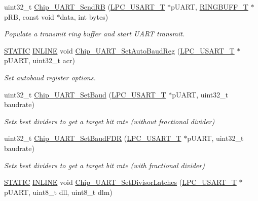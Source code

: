 \begin{DoxyCompactItemize}
uint32\+\_\+t \hyperlink{group__UART__17XX__40XX_ga6ed43ed19b9d2a32ece3e50bc2f651a9}{Chip\+\_\+\+U\+A\+R\+T\+\_\+\+Send\+RB} (\hyperlink{structLPC__USART__T}{L\+P\+C\+\_\+\+U\+S\+A\+R\+T\+\_\+T} $\ast$p\+U\+A\+RT, \hyperlink{structRINGBUFF__T}{R\+I\+N\+G\+B\+U\+F\+F\+\_\+T} $\ast$p\+RB, const void $\ast$data, int bytes)
\begin{DoxyCompactList}\small\item\em Populate a transmit ring buffer and start U\+A\+RT transmit. \end{DoxyCompactList}\item 
\hyperlink{group__LPC__Types__Public__Macros_ga10b2d890d871e1489bb02b7e70d9bdfb}{S\+T\+A\+T\+IC} \hyperlink{group__LPC__Types__Public__Types_ga2eb6f9e0395b47b8d5e3eeae4fe0c116}{I\+N\+L\+I\+NE} void \hyperlink{group__UART__17XX__40XX_ga4ae4f3c36bdae1bf8a93c0420ee74b40}{Chip\+\_\+\+U\+A\+R\+T\+\_\+\+Set\+Auto\+Baud\+Reg} (\hyperlink{structLPC__USART__T}{L\+P\+C\+\_\+\+U\+S\+A\+R\+T\+\_\+T} $\ast$p\+U\+A\+RT, uint32\+\_\+t acr)
\begin{DoxyCompactList}\small\item\em Set autobaud register options. \end{DoxyCompactList}\item 
uint32\+\_\+t \hyperlink{group__UART__17XX__40XX_ga19f24dcf53316cbfb204003f506d5be5}{Chip\+\_\+\+U\+A\+R\+T\+\_\+\+Set\+Baud} (\hyperlink{structLPC__USART__T}{L\+P\+C\+\_\+\+U\+S\+A\+R\+T\+\_\+T} $\ast$p\+U\+A\+RT, uint32\+\_\+t baudrate)
\begin{DoxyCompactList}\small\item\em Sets best dividers to get a target bit rate (without fractional divider) \end{DoxyCompactList}\item 
uint32\+\_\+t \hyperlink{group__UART__17XX__40XX_gad22ce7fc8360c02aab39b2dd586088fd}{Chip\+\_\+\+U\+A\+R\+T\+\_\+\+Set\+Baud\+F\+DR} (\hyperlink{structLPC__USART__T}{L\+P\+C\+\_\+\+U\+S\+A\+R\+T\+\_\+T} $\ast$p\+U\+A\+RT, uint32\+\_\+t baudrate)
\begin{DoxyCompactList}\small\item\em Sets best dividers to get a target bit rate (with fractional divider) \end{DoxyCompactList}\item 
\hyperlink{group__LPC__Types__Public__Macros_ga10b2d890d871e1489bb02b7e70d9bdfb}{S\+T\+A\+T\+IC} \hyperlink{group__LPC__Types__Public__Types_ga2eb6f9e0395b47b8d5e3eeae4fe0c116}{I\+N\+L\+I\+NE} void \hyperlink{group__UART__17XX__40XX_ga267fa73ca52d35a7f60f849727c3d2b6}{Chip\+\_\+\+U\+A\+R\+T\+\_\+\+Set\+Divisor\+Latches} (\hyperlink{structLPC__USART__T}{L\+P\+C\+\_\+\+U\+S\+A\+R\+T\+\_\+T} $\ast$p\+U\+A\+RT, uint8\+\_\+t dll, uint8\+\_\+t dlm)

\end{DoxyCompactItemize}
